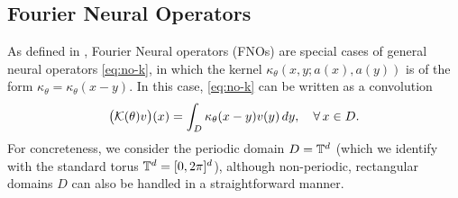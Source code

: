 \documentclass[reqno,a4paper]{amsart}
\begin{document}
\subsection{Fourier Neural Operators}
As defined in \cite{fourierop2020}, Fourier Neural operators (FNOs) are special cases of general neural operators \eqref{eq:no-k}, in which the kernel $\kappa_\theta(x,y;a(x),a(y))$ is of the form $\kappa_\theta = \kappa_\theta(x-y)$. In this case, \eqref{eq:no-k} can be written as a convolution
\begin{align} \label{eq:fno-k}
\big(\mathcal{K}({\theta}) v\big)(x)
=
\int_{D} \kappa_{\theta}(x-y) v(y) \, dy,
\quad
\forall \, x\in D.
\end{align}
For concreteness, we consider the periodic domain $D =\mathbb{T}^d$ (which we identify with the standard torus $\mathbb{T}^d = [0,2\pi]^d$), although non-periodic, rectangular domains $D$ can also be handled in a straightforward manner.
\end{document}
